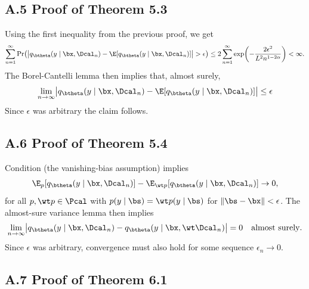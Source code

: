 \documentclass[aspectratio=169,10pt]{beamer}
\newcommand{\currentheading}{\ifx\insertsubsection\empty\insertsection\else\insertsubsection\fi}
\begin{document}
\subsection{A.5 Proof of Theorem 5.3}

\begin{frame}{\currentheading}
Using the first inequality from the previous proof, we get
\begin{align*}
	\sum_{n = 1}^\infty \Pr\bigl(	\bigl| q_{\btheta}(y \mid \bx, \Dcal_n) - \E[q_{\btheta}(y \mid \bx, \Dcal_n)] \bigr| > \epsilon\bigr) \le 2 	\sum_{n = 1}^\infty \exp\biggl(-\frac{2 \epsilon^2}{L^2 n^{1 - 2\alpha}}\biggr) < \infty.
\end{align*}
The Borel-Cantelli lemma then implies that, almost surely,
\begin{align*}
	\lim_{n \to \infty} \bigl| q_{\btheta}(y \mid \bx, \Dcal_n) - \E[q_{\btheta}(y \mid \bx, \Dcal_n)] \bigr| \le  \epsilon
\end{align*}
Since $\epsilon$ was arbitrary the claim follows.
\end{frame}

\subsection{A.6 Proof of Theorem 5.4}

\begin{frame}{\currentheading}
Condition (the vanishing-bias assumption) implies
\begin{align*}
	 \E_p[q_{\btheta}(y \mid \bx, \Dcal_n)] - 	 \E_{\wt p}[q_{\btheta}(y \mid \bx, \Dcal_n)]   \to 0,
\end{align*}
for all $p, \wt p \in \Pcal$ with $p(y \mid \bs) = \wt p(y \mid \bs)$ for $\| \bs - \bx\| < \epsilon$. The almost-sure variance lemma then implies
\begin{align*}
	\lim_{n \to \infty}\bigl| q_{\btheta}(y \mid \bx, \Dcal_n) - q_{\btheta}(y \mid \bx, \wt \Dcal_n) \bigr|  = 0 \quad \text{almost surely}.
\end{align*}
Since $\epsilon$ was arbitrary, convergence must also hold for some sequence $\epsilon_n \to 0$.
\end{frame}

\subsection{A.7 Proof of Theorem 6.1}
\end{document}
